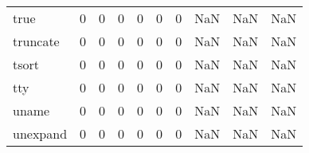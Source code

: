 \begin{longtable}{lrrrrrrrrr}
true      &                                                  0 &                                                  0 &                                                  0 &                                                  0 &                                                  0 &                                                  0 &                                                NaN &                                    NaN &                                  NaN \\
truncate  &                                                  0 &                                                  0 &                                                  0 &                                                  0 &                                                  0 &                                                  0 &                                                NaN &                                    NaN &                                  NaN \\
tsort     &                                                  0 &                                                  0 &                                                  0 &                                                  0 &                                                  0 &                                                  0 &                                                NaN &                                    NaN &                                  NaN \\
tty       &                                                  0 &                                                  0 &                                                  0 &                                                  0 &                                                  0 &                                                  0 &                                                NaN &                                    NaN &                                  NaN \\
uname     &                                                  0 &                                                  0 &                                                  0 &                                                  0 &                                                  0 &                                                  0 &                                                NaN &                                    NaN &                                  NaN \\
unexpand  &                                                  0 &                                                  0 &                                                  0 &                                                  0 &                                                  0 &                                                  0 &                                                NaN &                                    NaN &                                  NaN \\

\end{longtable}
